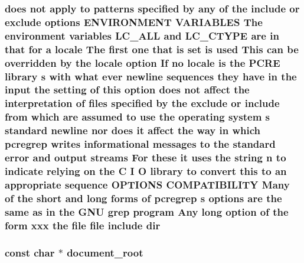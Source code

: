 \subsubsection[{\texorpdfstring{dir}{dir}}]{ does {\bf not} apply {\bf to} {\bf patterns} {\bf specified} by {\bf any} {\bf of} the {\bf include} {\bf or} {\bf exclude} {\bf options} E\+N\+V\+I\+R\+O\+N\+M\+E\+NT V\+A\+R\+I\+A\+B\+L\+ES The {\bf environment} {\bf variables} L\+C\+\_\+\+A\+LL and L\+C\+\_\+\+C\+T\+Y\+PE {\bf are} {\bf in} that for {\bf a} {\bf locale} The {\bf first} one that {\bf is} {\bf set} {\bf is} {\bf used} This {\bf can} {\bf be} overridden by the {\bf locale} {\bf option} If no {\bf locale} {\bf is} the {\bf P\+C\+RE} {\bf library} {\bf s} {\bf with} {\bf what} {\bf ever} {\bf newline} sequences they have {\bf in} the {\bf input} the {\bf setting} {\bf of} {\bf this} {\bf option} does {\bf not} affect the interpretation {\bf of} {\bf files} {\bf specified} by the {\bf exclude} {\bf or} {\bf include} {\bf from} {\bf which} {\bf are} assumed {\bf to} use the operating {\bf system} {\bf s} standard {\bf newline} nor does {\bf it} affect the {\bf way} {\bf in} {\bf which} pcregrep writes informational messages {\bf to} the standard {\bf error} and {\bf output} streams For these {\bf it} uses the {\bf string} {\bf n} {\bf to} indicate relying {\bf on} the {\bf C} {\bf I} O {\bf library} {\bf to} convert {\bf this} {\bf to} an appropriate {\bf sequence} {\bf O\+P\+T\+I\+O\+NS} C\+O\+M\+P\+A\+T\+I\+B\+I\+L\+I\+TY Many {\bf of} the short and long forms {\bf of} pcregrep {\bf s} {\bf options} {\bf are} the same {\bf as} {\bf in} the G\+NU {\bf grep} {\bf program} Any long {\bf option} {\bf of} the form {\bf xxx} the {\bf file} {\bf file} {\bf include} dir}\hypertarget{group__APACHE__CORE__DAEMON_ga6d902c83b02c43071b972ed0416729bc}{}\label{group__APACHE__CORE__DAEMON_ga6d902c83b02c43071b972ed0416729bc}
\subsubsection[{\texorpdfstring{document\+\_\+root}{document_root}}]{\setlength{\rightskip}{0pt plus 5cm}const char $\ast$ document\+\_\+root}\hypertarget{group__APACHE__CORE__DAEMON_gae6d749c77cf53887e389fee88eabb8fb}{}\label{group__APACHE__CORE__DAEMON_gae6d749c77cf53887e389fee88eabb8fb}
